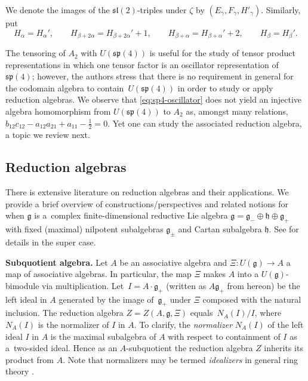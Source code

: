 \documentclass[10pt,a4paper]{amsart}
\numberwithin{equation}{section}
\begin{document}
We denote the images of the $\mathfrak{sl}(2)$-triples under $\zeta$ by $(E_\gamma,F_\gamma,H'_\gamma)$.
Similarly, put
\[H_\alpha = H_\alpha',\qquad H_{\beta+2\alpha}=H_{\beta+2\alpha}'+1,\qquad H_{\beta+\alpha}=H_{\beta+\alpha}'+2,\qquad H_\beta=H_\beta'.\]

\begin{Remark}
	The tensoring of $A_{2}$ with $U(\mathfrak{sp}(4))$ is useful for the study of tensor product representations in which one tensor factor is an oscillator representation of $\mathfrak{sp}(4)$; however, the authors stress that there is no requirement in general for the codomain algebra to contain~$U(\mathfrak{sp}(4))$ in order to study or apply reduction algebras. We observe that \eqref{eq:sp4-oscillator} does not yield an injective algebra homomorphism from $U(\mathfrak{sp}(4))$ to $A_{2}$ as, amongst many relations, $b_{12}c_{12} - a_{12}a_{21} + a_{11} - \frac{1}{2} = 0$. Yet one can study the associated reduction algebra, a topic we review next.
\end{Remark}

\subsection{Reduction algebras}\label{subsec:ReductionAlgebras}
There is extensive literature \cite{ashtonRmatrixMickelssonAlgebras2015,hartwigGhostCenterRepresentations2023,khoroshkinMickelssonAlgebrasZhelobenko2008,herlemontRingsHdeformedDifferential2017,vandenhomberghNoteMickelssonStep1975,zhelobenkoExtremalProjectorsGeneralized1989,zhelobenkoHypersymmetriesExtremalEquations1997} on reduction algebras and their applications.
We provide a brief overview of constructions/perspectives and related notions for when $\mathfrak{g}$ is a~complex finite-dimensional reductive Lie algebra $\mathfrak{g}=\mathfrak{g}_{-}\oplus\mathfrak{h}\oplus\mathfrak{g}_{+}$ with fixed (maximal) nilpotent subalgebras $\mathfrak{g}_{\pm}$ and Cartan subalgebra $\mathfrak{h}$. See \cite[Section~2]{hartwigDiagonalReductionAlgebra2022c} for details in the super case.

{\bf Subquotient algebra.} Let $A$ be an associative algebra and $\Xi\colon U(\mathfrak{g})\to A$ a map of associative algebras. In particular, the map $\Xi$ makes $A$ into a $U(\mathfrak{g})$-bimodule via multiplication. Let~${I=A\cdot \mathfrak{g}_+}$ (written as $A\mathfrak{g}_+$ from hereon) be the left ideal in $A$ generated by the image of~$\mathfrak{g}_+$ under $\Xi$ composed with the natural inclusion. The reduction algebra $Z = Z(A,\mathfrak{g},\Xi)$ equals~${N_{A}(I)/I}$, where $N_{A}(I)$ is the normalizer of $I$ in $A$. To clarify, the \emph{normalizer} $N_{A}(I)$ of the left ideal $I$ in $A$ is the maximal subalgebra of $A$ with respect to containment of $I$ as a~two-sided ideal. Hence as an $A$-subquotient the reduction algebra $Z$ inherits its product from $A$. Note that normalizers may be termed \emph{idealizers} in general ring theory \cite[specifically Section~2 for historical context]{jacobsonNonCommutativePolynomialsCyclic1934}.
\end{document}
